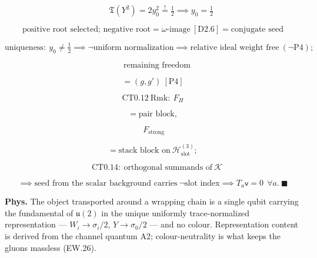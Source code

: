 \begin{theorem}
\[
\qquad \mathfrak T(Y^2)=2y_0^2\overset!=\tfrac12\implies y_0=\tfrac12
\]

\[
\text{positive root selected; negative root}=\omega\text{-image}\ [\mathrm{D2.6}]=\text{conjugate seed}
\]

\[
\text{uniqueness}:\ y_0\ne\tfrac12\implies\neg\text{uniform normalization}\implies\text{relative ideal weight free}\ (\neg\mathrm{P4});
\]

\[
\quad\text{remaining freedom}
\]

\[
= (g,g')\ [\mathrm{P4}]
\]

\[
\mathrm{CT0.12\ Rmk}:\ F_H
\]

\[
= \text{pair block},
\]

\[
\ F_{\mathrm{strong}}
\]

\[
= \text{stack block on}\ \mathcal H^{(3)}_{\mathrm{slot}};
\]

\[
\quad\mathrm{CT0.14}:\ \text{orthogonal summands of}\ \mathcal K
\]

\[
\implies\text{seed from the scalar background carries}\ \neg\text{slot index}\implies T_a\mathsf v=0\ \ \forall a.\ \blacksquare
\]

\textbf{Phys.} The object transported around a wrapping chain is a single qubit carrying the fundamental of $\mathfrak u(2)$ in the unique uniformly trace-normalized representation — $W_i\to\sigma_i/2$, $Y\to\sigma_0/2$ — and no colour. Representation content is derived from the channel quantum A2; colour-neutrality is what keeps the gluons massless (EW.26).

\end{theorem}


